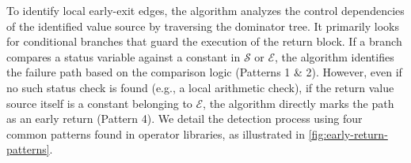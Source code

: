 To identify local early-exit edges, the algorithm analyzes the control dependencies of the identified value source by traversing the dominator tree.
It primarily looks for conditional branches that guard the execution of the return block.
If a branch compares a status variable against a constant in $\mathcal{S}$ or $\mathcal{E}$, the algorithm identifies the failure path based on the comparison logic (Patterns 1 \& 2).
However, even if no such status check is found (e.g., a local arithmetic check), if the return value source itself is a constant belonging to $\mathcal{E}$, the algorithm directly marks the path as an early return (Pattern 4).
We detail the detection process using four common patterns found in operator libraries, as illustrated in \autoref{fig:early-return-patterns}.

\begin{figure}[ht]
  \centering
  \begin{minipage}{0.62\textwidth}
    \centering
    
  \end{minipage}%
  \hfill %
  \begin{minipage}{0.36\textwidth}
    \centering
    \setlength{\tabcolsep}{1pt}
    

\end{minipage}
\end{figure}
